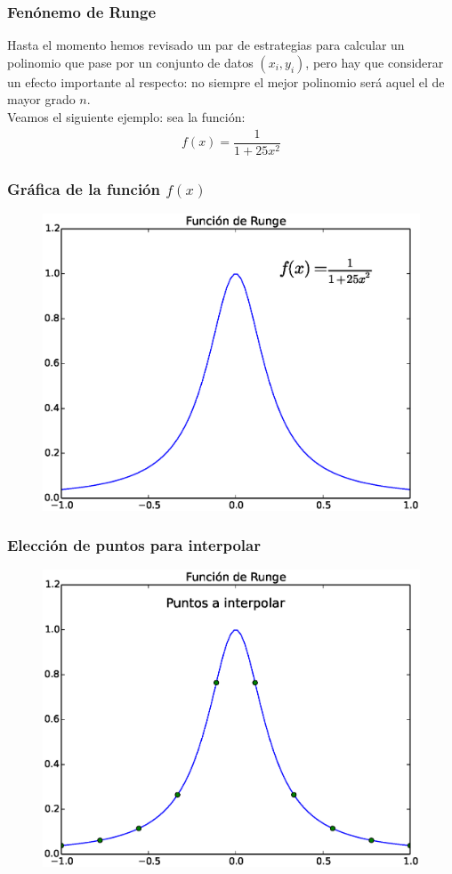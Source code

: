 \documentclass[12pt]{beamer}
\begin{document}
\begin{frame}
\frametitle{Fenónemo de Runge}
Hasta el momento hemos revisado un par de estrategias para calcular un polinomio que pase por un conjunto de datos $(x_{i}, y_{i})$, pero hay que considerar un efecto importante al respecto: no siempre el mejor polinomio será aquel el de mayor grado $n$.
\\
\medskip
\pause
Veamos el siguiente ejemplo: sea la función:
\begin{align*}
f (x) = \dfrac{1}{1 + 25 x^{2}}
\end{align*}
\end{frame}
\begin{frame}
\frametitle{Gráfica de la función $f(x)$}
\begin{figure}
	\centering
	\includegraphics[scale=0.47]{Imagenes/Funcion_Runge_01.eps} 
\end{figure}
\end{frame}
\begin{frame}
\frametitle{Elección de puntos para interpolar}
\begin{figure}
	\centering
	\includegraphics[scale=0.47]{Imagenes/Funcion_Runge_02.eps} 
\end{figure}
\end{frame}
\end{document}

